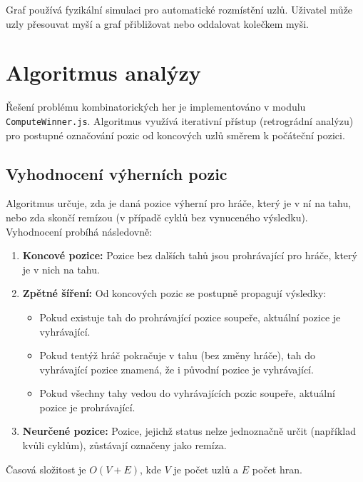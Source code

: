 Graf používá fyzikální simulaci pro automatické rozmístění uzlů. Uživatel může uzly přesouvat myší a graf přibližovat nebo oddalovat kolečkem myši.

\section{Algoritmus analýzy}
\label{sec:GamesAlgorithm}

Řešení problému kombinatorických her je implementováno v modulu \texttt{ComputeWinner.js}. Algoritmus využívá iterativní přístup (retrográdní analýzu) pro postupné označování pozic od koncových uzlů směrem k počáteční pozici.

\subsection{Vyhodnocení výherních pozic}
\label{sec:GamesRetrograde}

Algoritmus určuje, zda je daná pozice výherní pro hráče, který je v ní na tahu, nebo zda skončí remízou (v případě cyklů bez vynuceného výsledku). Vyhodnocení probíhá následovně:

\begin{enumerate}
    \item \textbf{Koncové pozice:} Pozice bez dalších tahů jsou prohrávající pro hráče, který je v nich na tahu.
    
    \item \textbf{Zpětné šíření:} Od koncových pozic se postupně propagují výsledky:
    \begin{itemize}
        \item Pokud existuje tah do prohrávající pozice soupeře, aktuální pozice je vyhrávající.
        \item Pokud tentýž hráč pokračuje v tahu (bez změny hráče), tah do vyhrávající pozice znamená, že i původní pozice je vyhrávající.
        \item Pokud všechny tahy vedou do vyhrávajících pozic soupeře, aktuální pozice je prohrávající.
    \end{itemize}
    
    \item \textbf{Neurčené pozice:} Pozice, jejichž status nelze jednoznačně určit (například kvůli cyklům), zůstávají označeny jako remíza.
\end{enumerate}

Časová složitost je \( O(V + E) \), kde \( V \) je počet uzlů a \( E \) počet hran.

